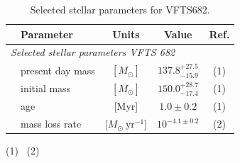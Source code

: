 \documentclass[apjl,twocolumn]{emulateapj}
\begin{document}
\begin{table}
  \begin{center}
    \caption{Selected stellar parameters for VFTS682. }
    \begin{tabular}{llc|c|c}
      \hline
      \hline
      &Parameter & Units & Value & Ref.\\
     
       \hline
       \multicolumn{5}{l}{\emph{Selected stellar parameters VFTS 682}}
      \\
      \hline
     & present day mass  & $[M_\odot]$ & $137.8^{+27.5}_
                                           {-15.9}$ & (1)
                                                    \\
      & initial mass& $[M_\odot]$ & $150.0^{+28.7}_{-17.4}$ & (1)
      \\
      &age & [Myr] & $1.0\pm0.2$ & (1) \\
      &mass loss rate & [$M_\odot \ \mathrm{yr}^{-1}$] & $10^{-4.1\pm0.2}$ & (2)\\
      \hline

    \end{tabular}
    \tablecomments
    { 
      (1)~\cite{schneider:18}
      (2)~\cite{bestenlehner:11}
    }
  \end{center}
  \label{tab:star_param}
\end{table}
\end{document}
